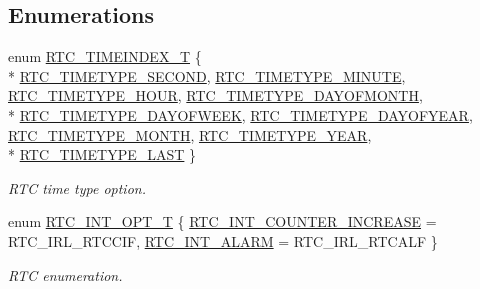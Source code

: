 \subsection*{Enumerations}
\begin{DoxyCompactItemize}
\item 
enum \hyperlink{group__RTC__17XX__40XX_ga8144898fe628404d396db06dc8aac0e0}{R\-T\-C\-\_\-\-T\-I\-M\-E\-I\-N\-D\-E\-X\-\_\-\-T} \{ \\*
\hyperlink{group__RTC__17XX__40XX_gga8144898fe628404d396db06dc8aac0e0ac0bdc1ff011be37cfeecb77c241e7fb8}{R\-T\-C\-\_\-\-T\-I\-M\-E\-T\-Y\-P\-E\-\_\-\-S\-E\-C\-O\-N\-D}, 
\hyperlink{group__RTC__17XX__40XX_gga8144898fe628404d396db06dc8aac0e0a11974e5996bfe6fbf0381d7ef3836964}{R\-T\-C\-\_\-\-T\-I\-M\-E\-T\-Y\-P\-E\-\_\-\-M\-I\-N\-U\-T\-E}, 
\hyperlink{group__RTC__17XX__40XX_gga8144898fe628404d396db06dc8aac0e0a4e88c263358395fecc19306556addacc}{R\-T\-C\-\_\-\-T\-I\-M\-E\-T\-Y\-P\-E\-\_\-\-H\-O\-U\-R}, 
\hyperlink{group__RTC__17XX__40XX_gga8144898fe628404d396db06dc8aac0e0a3cc8b55755f86e8a6a1a870a79122324}{R\-T\-C\-\_\-\-T\-I\-M\-E\-T\-Y\-P\-E\-\_\-\-D\-A\-Y\-O\-F\-M\-O\-N\-T\-H}, 
\\*
\hyperlink{group__RTC__17XX__40XX_gga8144898fe628404d396db06dc8aac0e0a88f328753d58927fafd45b35e0815e80}{R\-T\-C\-\_\-\-T\-I\-M\-E\-T\-Y\-P\-E\-\_\-\-D\-A\-Y\-O\-F\-W\-E\-E\-K}, 
\hyperlink{group__RTC__17XX__40XX_gga8144898fe628404d396db06dc8aac0e0ad05ce02297b482d4fa5b6a491ff04aff}{R\-T\-C\-\_\-\-T\-I\-M\-E\-T\-Y\-P\-E\-\_\-\-D\-A\-Y\-O\-F\-Y\-E\-A\-R}, 
\hyperlink{group__RTC__17XX__40XX_gga8144898fe628404d396db06dc8aac0e0a45d2078908fb25a714cbd01766f55fae}{R\-T\-C\-\_\-\-T\-I\-M\-E\-T\-Y\-P\-E\-\_\-\-M\-O\-N\-T\-H}, 
\hyperlink{group__RTC__17XX__40XX_gga8144898fe628404d396db06dc8aac0e0a780e93b1c505ed02ed139894566fcfe0}{R\-T\-C\-\_\-\-T\-I\-M\-E\-T\-Y\-P\-E\-\_\-\-Y\-E\-A\-R}, 
\\*
\hyperlink{group__RTC__17XX__40XX_gga8144898fe628404d396db06dc8aac0e0a0d4fafef57b6ef363f9a0875ff339cad}{R\-T\-C\-\_\-\-T\-I\-M\-E\-T\-Y\-P\-E\-\_\-\-L\-A\-S\-T}
 \}
\begin{DoxyCompactList}\small\item\em R\-T\-C time type option. \end{DoxyCompactList}\item 
enum \hyperlink{group__RTC__17XX__40XX_gacbb4f3e21ac0f90878c95afe11f49161}{R\-T\-C\-\_\-\-I\-N\-T\-\_\-\-O\-P\-T\-\_\-\-T} \{ \hyperlink{group__RTC__17XX__40XX_ggacbb4f3e21ac0f90878c95afe11f49161a1545f38fd2671cb7521a77e7da3bde4d}{R\-T\-C\-\_\-\-I\-N\-T\-\_\-\-C\-O\-U\-N\-T\-E\-R\-\_\-\-I\-N\-C\-R\-E\-A\-S\-E} = R\-T\-C\-\_\-\-I\-R\-L\-\_\-\-R\-T\-C\-C\-I\-F, 
\hyperlink{group__RTC__17XX__40XX_ggacbb4f3e21ac0f90878c95afe11f49161adec1af649886bf5a419d636276ca54a5}{R\-T\-C\-\_\-\-I\-N\-T\-\_\-\-A\-L\-A\-R\-M} = R\-T\-C\-\_\-\-I\-R\-L\-\_\-\-R\-T\-C\-A\-L\-F
 \}
\begin{DoxyCompactList}\small\item\em R\-T\-C enumeration. \end{DoxyCompactList}\end{DoxyCompactItemize}
